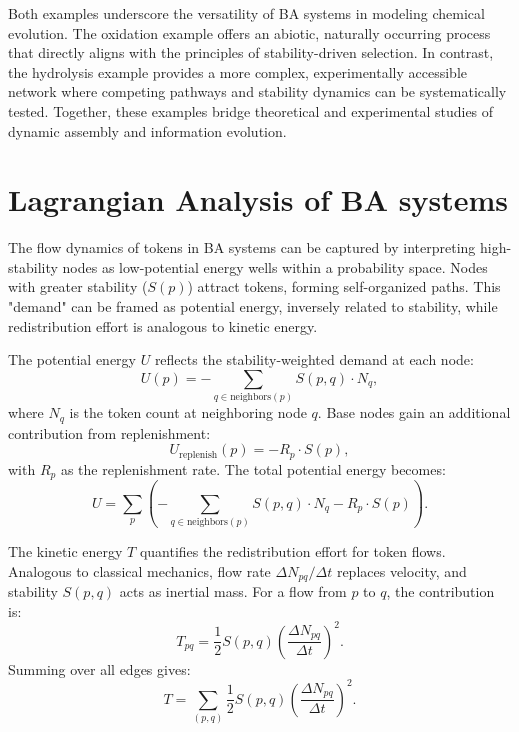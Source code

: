 \documentclass[entropy,article,submit,pdftex,oneauthor]{Definitions/mdpi}
\begin{document}
Both examples underscore the versatility of BA systems in modeling chemical evolution. The oxidation example offers an abiotic, naturally occurring process that directly aligns with the principles of stability-driven selection. In contrast, the hydrolysis example provides a more complex, experimentally accessible network where competing pathways and stability dynamics can be systematically tested. Together, these examples bridge theoretical and experimental studies of dynamic assembly and information evolution.


\section{Lagrangian Analysis of BA systems}

The flow dynamics of tokens in BA systems can be captured by interpreting high-stability nodes as low-potential energy wells within a probability space. Nodes with greater stability (\( S(p) \)) attract tokens, forming self-organized paths. This "demand" can be framed as potential energy, inversely related to stability, while redistribution effort is analogous to kinetic energy.

The potential energy \( U \) reflects the stability-weighted demand at each node:
\begin{equation}
U(p) = -\sum_{q \in \text{neighbors}(p)} S(p, q) \cdot N_q,
\end{equation}
where \( N_q \) is the token count at neighboring node \( q \). Base nodes gain an additional contribution from replenishment:
\begin{equation}
U_{\text{replenish}}(p) = -R_p \cdot S(p),
\end{equation}
with \( R_p \) as the replenishment rate. The total potential energy becomes:
\begin{equation}
U = \sum_{p} \left( -\sum_{q \in \text{neighbors}(p)} S(p, q) \cdot N_q - R_p \cdot S(p) \right).
\end{equation}

The kinetic energy \( T \) quantifies the redistribution effort for token flows. Analogous to classical mechanics, flow rate \( \Delta N_{pq} / \Delta t \) replaces velocity, and stability \( S(p, q) \) acts as inertial mass. For a flow from \( p \) to \( q \), the contribution is:
\begin{equation}
T_{pq} = \frac{1}{2} S(p, q) \left( \frac{\Delta N_{pq}}{\Delta t} \right)^2.
\end{equation}
Summing over all edges gives:
\begin{equation}
T = \sum_{(p, q)} \frac{1}{2} S(p, q) \left( \frac{\Delta N_{pq}}{\Delta t} \right)^2.
\end{equation}
\end{document}
